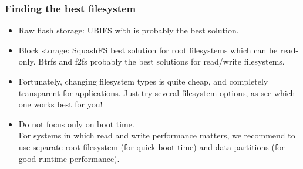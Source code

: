 \begin{frame}
\frametitle{Finding the best filesystem}
\begin{itemize}
\item Raw flash storage: UBIFS with  is
      probably the best solution.
\item Block storage: SquashFS best solution for root filesystems
      which can be read-only. Btrfs and f2fs probably the best solutions
      for read/write filesystems.
\item Fortunately, changing filesystem types is quite cheap,
      and completely transparent for applications. Just try
      several filesystem options, as see which one works best
      for you!
\item Do not focus only on boot time. \\
      For systems in which read and write performance matters, we
      recommend to use separate root filesystem (for quick
      boot time) and data partitions (for good runtime performance).
\end{itemize}
\end{frame}
